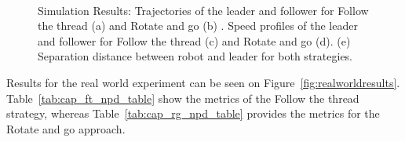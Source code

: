 \documentclass[journal]{IEEEtran}
\begin{document}
\begin{figure}
    \\
    \vspace*{-2.5em}
  \caption{Simulation Results: Trajectories of the leader and follower for Follow the thread (a) and Rotate and go (b) . 
        Speed profiles of the leader and follower for Follow the thread (c) and Rotate and go (d). 
        (e) Separation distance between robot and leader for both strategies.}
  \label{fig:simulationresults} 
\end{figure}



Results for the real world experiment can be seen on Figure~\ref{fig:realworldresults}.   Table~\ref{tab:cap_ft_npd_table} show the metrics of the Follow the thread strategy, whereas Table~\ref{tab:cap_rg_npd_table} provides the metrics for the Rotate and go approach.

%
%
%
%
%
%
%
%
\end{document}
